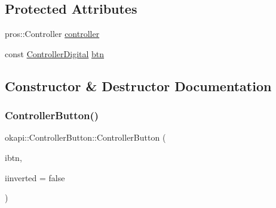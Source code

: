 \subsection*{Protected Attributes}
\begin{DoxyCompactItemize}
\item 
pros\+::\+Controller \mbox{\hyperlink{classokapi_1_1ControllerButton_a7cbfbe335f633c6f7d12d12d51f0c830}{controller}}
\item 
const \mbox{\hyperlink{namespaceokapi_af5040b3f1f33d27698871423e1453ab6}{Controller\+Digital}} \mbox{\hyperlink{classokapi_1_1ControllerButton_a1839a778e3a25b7cfcd954e733f74321}{btn}}
\end{DoxyCompactItemize}


\subsection{Constructor \& Destructor Documentation}
\mbox{\label{classokapi_1_1ControllerButton_a4c82179b73b34bae616c5fe180c207a4}} 
\subsubsection{\texorpdfstring{ControllerButton()}{ControllerButton()}\hspace{0.1cm}{\footnotesize\ttfamily [1/2]}}
{\footnotesize\ttfamily okapi\+::\+Controller\+Button\+::\+Controller\+Button (\begin{DoxyParamCaption}\item[{\mbox{\hyperlink{namespaceokapi_af5040b3f1f33d27698871423e1453ab6}{Controller\+Digital}}}]{ibtn,  }\item[{bool}]{iinverted = {\ttfamily false} }\end{DoxyParamCaption})}

\mbox{\label{classokapi_1_1ControllerButton_a491473201555bb78fb5dc20666e12bcf}} 
